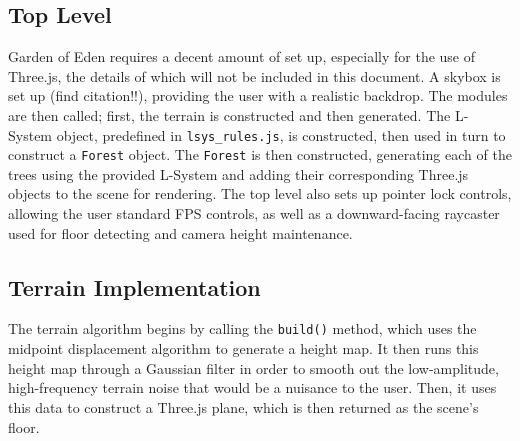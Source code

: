 \documentclass{article}
\newcommand{\tab}{\hspace*{2em}}
\begin{document}
        \subsection{Top Level}
    \tab Garden of Eden requires a decent amount of set up, especially for the use of Three.js, the
details of which will not be included in this document. A skybox is set up (find citation!!),
providing the user with a realistic backdrop. The modules are then called; first, the terrain is
constructed and then generated. The L-System object, predefined in \verb|lsys_rules.js|, is
constructed, then used in turn to construct a \verb|Forest| object. The \verb|Forest| is then
constructed, generating each of the trees using the provided L-System and adding their
corresponding Three.js objects to the scene for rendering. The top level also sets up pointer lock
controls, allowing the user standard FPS controls, as well as a downward-facing raycaster used for
floor detecting and camera height maintenance.

        \subsection{Terrain Implementation}
    \tab The terrain algorithm begins by calling the \verb|build()| method, which uses the midpoint
displacement algorithm to generate a height map. It then runs this height map through a Gaussian
filter in order to smooth out the low-amplitude, high-frequency terrain noise that would be a
nuisance to the user. Then, it uses this data to construct a Three.js plane, which is then returned
as the scene's floor.
\end{document}
